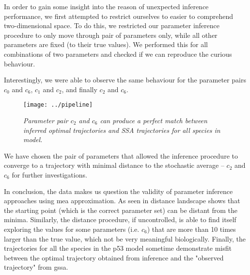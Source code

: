 
In order to gain some insight into the reason of unexpected inference performance, we first attempted to restrict ourselves to easier to comprehend two-dimensional space.
To do this, we restricted our parameter inference procedure to only move through pair of parameters only, while all other parameters are fixed (to their true values). 
We performed this for all combinations of two parameters and checked if we can reproduce the curious behaviour.

Interestingly, we were able to observe the same behaviour for the parameter pairs $c_0$ and $c_6$, $c_1$ and $c_2$, and finally $c_2$ and $c_6$.
\begin{figure}
\texttt{[image: ../pipeline]}
\caption{\emph{Parameter pair $c_2$ and $c_6$ can produce a perfect match between inferred optimal trajectories and SSA trajectories for all species in \pft{} model.}}
\label{fig:}
\end{figure}

We have chosen the pair of parameters that allowed the inference procedure to converge to a trajectory with minimal distance to the stochastic average -- $c_2$ and $c_6$ for further investigations.
 

In conclusion, the data makes us question the validity of parameter inference approaches using \gls{mea} approximation.
As seen in  distance landscape shows that the starting point (which is the correct parameter set) can be distant from the minima. Similarly, the distance procedure, if uncontrolled, is able to find itself exploring the values for some parameters (i.e. $c_6$) that are more than 10 times larger than the true value, which not be very meaningful biologically.
Finally, the trajectories for all the species in the p53 model sometime demonstrate misfit between the optimal trajectory obtained from inference and the "observed trajectory" from \gls{gssa}. 

